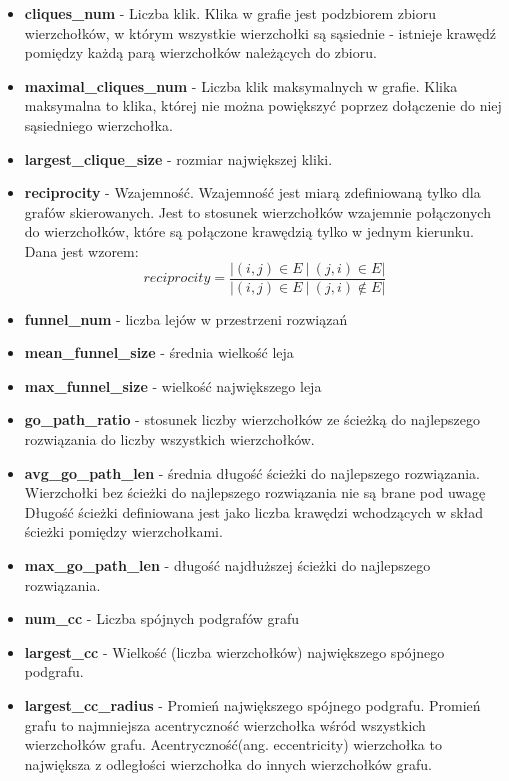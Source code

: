 \begin{itemize}
      \item \textbf{cliques\_num} - Liczba klik. Klika w grafie jest podzbiorem zbioru wierzchołków, w którym wszystkie wierzchołki są sąsiednie - istnieje krawędź pomiędzy każdą parą wierzchołków należących do zbioru.
      \item \textbf{maximal\_cliques\_num} - Liczba klik maksymalnych w grafie. Klika maksymalna to klika, której nie można powiększyć poprzez dołączenie do niej sąsiedniego wierzchołka.
      \item \textbf{largest\_clique\_size} - rozmiar największej kliki.
      \item \textbf{reciprocity} - Wzajemność. Wzajemność jest miarą zdefiniowaną tylko dla grafów skierowanych. Jest to stosunek wierzchołków wzajemnie połączonych do wierzchołków, które są połączone krawędzią tylko w jednym kierunku.
            Dana jest wzorem:
            $$reciprocity = \frac{ |(i, j) \in E  \: | \: (j, i) \in E| }{|(i, j) \in E  \: | \: (j, i) \notin E| }$$
      \item \textbf{funnel\_num} - liczba lejów w przestrzeni rozwiązań
      \item \textbf{mean\_funnel\_size} - średnia wielkość leja
      \item \textbf{max\_funnel\_size} - wielkość największego leja
      \item \textbf{go\_path\_ratio} - stosunek liczby wierzchołków ze ścieżką do najlepszego rozwiązania do liczby wszystkich wierzchołków.
      \item \textbf{avg\_go\_path\_len} - średnia długość ścieżki do najlepszego rozwiązania. Wierzchołki bez ścieżki do najlepszego rozwiązania nie są brane pod uwagę
            Długość ścieżki definiowana jest jako liczba krawędzi wchodzących w skład ścieżki pomiędzy wierzchołkami.
      \item \textbf{max\_go\_path\_len} - długość najdłuższej ścieżki do najlepszego rozwiązania.
      \item \textbf{num\_cc} - Liczba spójnych podgrafów grafu
      \item \textbf{largest\_cc} - Wielkość (liczba wierzchołków) największego spójnego podgrafu.
      \item \textbf{largest\_cc\_radius} - Promień największego spójnego podgrafu. Promień grafu to najmniejsza acentryczność wierzchołka wśród wszystkich wierzchołków grafu.
            Acentryczność(ang. eccentricity) wierzchołka to największa z odległości wierzchołka do innych wierzchołków grafu.
\end{itemize}


